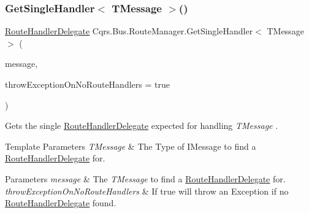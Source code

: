 \subsubsection{\texorpdfstring{Get\+Single\+Handler$<$ T\+Message $>$()}{GetSingleHandler< TMessage >()}\hspace{0.1cm}{\footnotesize\ttfamily [2/2]}}
{\footnotesize\ttfamily \hyperlink{classCqrs_1_1Bus_1_1RouteHandlerDelegate}{Route\+Handler\+Delegate} Cqrs.\+Bus.\+Route\+Manager.\+Get\+Single\+Handler$<$ T\+Message $>$ (\begin{DoxyParamCaption}\item[{T\+Message}]{message,  }\item[{bool}]{throw\+Exception\+On\+No\+Route\+Handlers = {\ttfamily true} }\end{DoxyParamCaption})}



Gets the single \hyperlink{classCqrs_1_1Bus_1_1RouteHandlerDelegate}{Route\+Handler\+Delegate} expected for handling {\itshape T\+Message} . 


\begin{DoxyTemplParams}{Template Parameters}
{\em T\+Message} & The Type of I\+Message to find a \hyperlink{classCqrs_1_1Bus_1_1RouteHandlerDelegate}{Route\+Handler\+Delegate} for.\\
\hline
\end{DoxyTemplParams}

\begin{DoxyParams}{Parameters}
{\em message} & The {\itshape T\+Message}  to find a \hyperlink{classCqrs_1_1Bus_1_1RouteHandlerDelegate}{Route\+Handler\+Delegate} for. \\
\hline
{\em throw\+Exception\+On\+No\+Route\+Handlers} & If true will throw an Exception if no \hyperlink{classCqrs_1_1Bus_1_1RouteHandlerDelegate}{Route\+Handler\+Delegate} found.\\
\hline
\end{DoxyParams}

